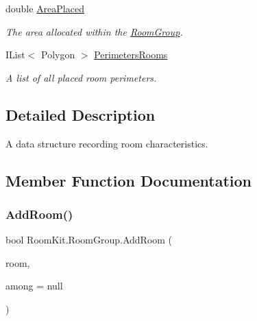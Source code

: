 \begin{DoxyCompactItemize}
double \mbox{\hyperlink{class_room_kit_1_1_room_group_af3839f139987ea48a2e5db693d3ff957}{Area\+Placed}}
\begin{DoxyCompactList}\small\item\em The area allocated within the \mbox{\hyperlink{class_room_kit_1_1_room_group}{Room\+Group}}. \end{DoxyCompactList}\item 
I\+List$<$ Polygon $>$ \mbox{\hyperlink{class_room_kit_1_1_room_group_ac489ddfd60ab7b2bbb894607d8271dc3}{Perimeters\+Rooms}}
\begin{DoxyCompactList}\small\item\em A list of all placed room perimeters. \end{DoxyCompactList}\end{DoxyCompactItemize}


\subsection{Detailed Description}
A data structure recording room characteristics. 



\subsection{Member Function Documentation}
\mbox{\label{class_room_kit_1_1_room_group_ae03763e59aac486b0d61709bb7cee038}} 
\subsubsection{\texorpdfstring{Add\+Room()}{AddRoom()}}
{\footnotesize\ttfamily bool Room\+Kit.\+Room\+Group.\+Add\+Room (\begin{DoxyParamCaption}\item[{\mbox{\hyperlink{class_room_kit_1_1_room}{Room}}}]{room,  }\item[{I\+List$<$ Polygon $>$}]{among = {\ttfamily null} }\end{DoxyParamCaption})}



